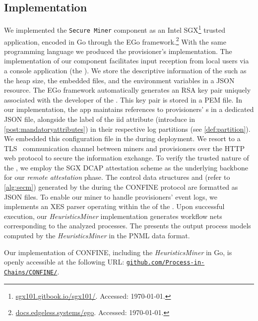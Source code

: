 \subsection{Implementation}
\label{sec:implementation:details}
\begin{newj}
We implemented the \texttt{Secure Miner} component as an Intel SGX\footnote{\url{sgx101.gitbook.io/sgx101/}. Accessed: \today.} trusted application, encoded in Go through the EGo framework.\footnote{\url{docs.edgeless.systems/ego}. Accessed: \today.} With the same programming language we produced the provisioner's  implementation. 
The implementation of our  component facilitates input reception from local users via a console application (the ). We store the descriptive information of the  such as the heap size, the embedded files, and the environment variables in a JSON resource. The EGo framework automatically generates an RSA key pair uniquely associated with the developer of the . This key pair is stored in a PEM file. In our implementation, the  app maintains references to provisioners' s in a dedicated JSON file, alongside the label of the iid attribute (introduce in \cref{post:mandatoryattributes}) in their respective log partitions (see \cref{def:partition}). We embedded this configuration file in the  during deployment. We resort to a TLS~\citep{Thomas/2000:SSL-TLS} communication channel between miners and provisioners over the HTTP web protocol to secure the information exchange. To verify the trusted nature of the , we employ the SGX DCAP attestation scheme as the underlying backbone for our \emph{remote attestation} phase. The control data structures {\CIDMap} and {\LPrvMap} (refer to \cref{alg:secm}) generated by the  during the CONFINE protocol are formatted as JSON files. To enable our miner  to handle provisioners' event logs, we implements an XES parser operating within the  of the . Upon successful execution, our \textit{HeuristicsMiner} implementation generates workflow nets corresponding to the analyzed processes. The  presents the output process models computed by the \textit{HeuristicsMiner} in the PNML data format. 

Our implementation of CONFINE, including the \textit{HeuristicsMiner} in Go, is openly accessible at the following URL: \href{https://github.com/Process-in-Chains/CONFINE/}{\nolinkurl{github.com/Process-in-Chains/CONFINE/}}.    



\end{newj}
